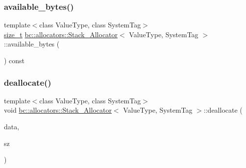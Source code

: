 \mbox{\label{classbc_1_1allocators_1_1Stack__Allocator_ad124466e5e6cc7cecb4023d28a4be432}} 
\subsubsection{\texorpdfstring{available\+\_\+bytes()}{available\_bytes()}}
{\footnotesize\ttfamily template$<$class Value\+Type, class System\+Tag$>$ \\
\hyperlink{namespacebc_aaf8e3fbf99b04b1b57c4f80c6f55d3c5}{size\+\_\+t} \hyperlink{classbc_1_1allocators_1_1Stack__Allocator}{bc\+::allocators\+::\+Stack\+\_\+\+Allocator}$<$ Value\+Type, System\+Tag $>$\+::available\+\_\+bytes (\begin{DoxyParamCaption}{ }\end{DoxyParamCaption}) const\hspace{0.3cm}{\ttfamily [inline]}}

\mbox{\label{classbc_1_1allocators_1_1Stack__Allocator_a9cb9920991b8357a447b346e278d6564}} 
\subsubsection{\texorpdfstring{deallocate()}{deallocate()}}
{\footnotesize\ttfamily template$<$class Value\+Type, class System\+Tag$>$ \\
void \hyperlink{classbc_1_1allocators_1_1Stack__Allocator}{bc\+::allocators\+::\+Stack\+\_\+\+Allocator}$<$ Value\+Type, System\+Tag $>$\+::deallocate (\begin{DoxyParamCaption}\item[{Value\+Type $\ast$}]{data,  }\item[{std\+::size\+\_\+t}]{sz }\end{DoxyParamCaption})\hspace{0.3cm}{\ttfamily [inline]}}

